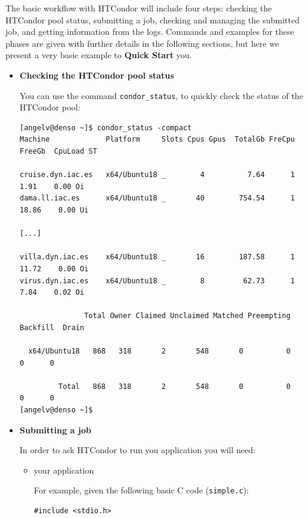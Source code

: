 \documentclass[a4paper,10pt]{article}
\begin{document}
The basic workflow with HTCondor will include four steps: checking the HTCondor
pool status, submitting a job, checking and managing the submitted job, and
getting information from the logs. Commands and examples for these phases are
given with further details in the following sections, but here we present a very
basic example to \textbf{Quick Start} you. 

\begin{itemize}
\item \textbf{Checking the HTCondor pool status}

You can use the command \texttt{condor\_status}, to quickly check the status of the
HTCondor pool:

\begin{mdframed}
\begin{verbatim}
[angelv@denso ~]$ condor_status -compact
Machine             Platform     Slots Cpus Gpus  TotalGb FreCpu  FreeGb  CpuLoad ST

cruise.dyn.iac.es   x64/Ubuntu18 _        4          7.64      1     1.91    0.00 Oi
dama.ll.iac.es      x64/Ubuntu18 _       40        754.54      1    18.86    0.00 Ui

[...]

villa.dyn.iac.es    x64/Ubuntu18 _       16        187.58      1    11.72    0.00 Oi
virus.dyn.iac.es    x64/Ubuntu18 _        8         62.73      1     7.84    0.02 Oi

               Total Owner Claimed Unclaimed Matched Preempting Backfill  Drain

  x64/Ubuntu18   868   318       2       548       0          0        0      0

         Total   868   318       2       548       0          0        0      0
[angelv@denso ~]$ 
\end{verbatim}
\end{mdframed}

\item \textbf{Submitting a job}

In order to ask HTCondor to run you application you will need:

\begin{itemize}
\item your application

For example, given the following basic C code (\texttt{simple.c}):
\begin{mdframed}
\lstset{language=C,label= ,caption= ,captionpos=b,numbers=none}
\begin{lstlisting}
#include <stdio.h>


\end{lstlisting}
\end{mdframed}
\end{itemize}
\end{itemize}
\end{document}
